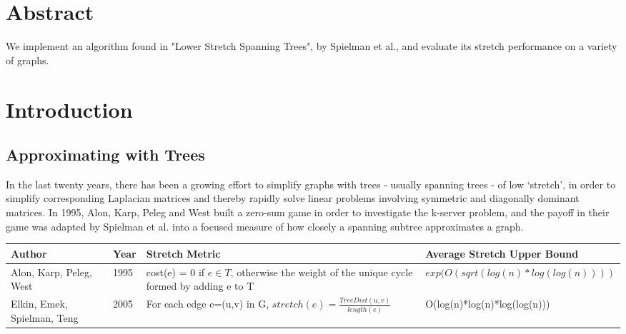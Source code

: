 \documentclass{article}
\title{\cTitle}
\author{\cAuthor}
\begin{document}
\maketitle

\section*{Abstract}
We implement an algorithm found in "Lower Stretch Spanning Trees", by Spielman et al., and evaluate its stretch performance on a variety of graphs.
\section*{Introduction}
\subsection*{Approximating with Trees}
In the last twenty years, there has been a growing effort to simplify graphs with trees - usually spanning trees - of low `stretch', in order to simplify corresponding Laplacian matrices and thereby rapidly solve linear problems involving symmetric and diagonally dominant matrices.
In 1995, Alon, Karp, Peleg and West\cite{akpw:game} built a zero-sum game in order to investigate the k-server problem\cite{wiki:kserver}, and the payoff in their game was adapted by Spielman et al.\cite{spielman:lower-stretch} into a focused measure of how closely a spanning subtree approximates a graph.

\begin{table}
    \begin{tabular}{|p{3cm}|l|p{5cm}|l|}
    \hline
    Author                      &         Year &                Stretch Metric                                                                              & Average Stretch Upper Bound                             \\ \hline
    Alon, Karp, Peleg, West     & 1995 &           cost(e) = 0 if $e \in T$, otherwise the weight of the unique cycle formed by adding e to T  &                         $exp(O(sqrt(log(n)*log(log(n))))$ \\ \hline
    Elkin, Emek, Spielman, Teng & 2005 & For each edge e=(u,v) in G, $stretch(e) = \frac{TreeDist(u,v)}{length(e)}$                            & O(log(n)*log(n)*log(log(n)))                            \\ \hline
    \end{tabular}
\end{table}
\end{document}
